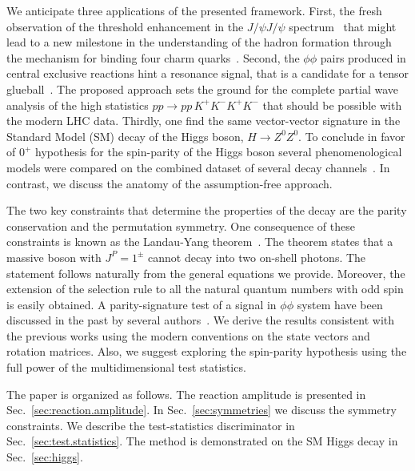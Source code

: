\documentclass[prd,preprintnumbers,floatfix,
nofootinbib,superscriptaddress]{revtex4}
\begin{document}
We anticipate three applications of the presented framework.
First, the fresh observation of the threshold enhancement in the $J/\psi J/\psi$ spectrum~\cite{Aaij:2020xyz}
that might lead to a new milestone in the understanding of the hadron formation through the mechanism for binding four charm quarks~\cite{Liu:2019zoy}.
Second, the $\phi\phi$ pairs produced in central exclusive reactions hint a resonance signal, that is a candidate for a tensor glueball~\cite{Lebiedowicz:2019jru}.
The proposed approach sets the ground for the complete partial wave analysis of the high statistics $pp\to pp\,K^+K^-K^+K^-$ that
should be possible with the modern LHC data.
Thirdly, one find the same vector-vector signature in the Standard Model (SM) decay of the Higgs boson, $H\to Z^0Z^0$.
To conclude in favor of $0^+$ hypothesis for the spin-parity of the Higgs boson
several phenomenological models were compared on the combined dataset of several decay channels~\cite{Aad:2013xqa,CMS:2018mmw}.
In contrast, we discuss the anatomy of the assumption-free approach.

The two key constraints that determine the properties of the decay are the parity conservation and the permutation symmetry.
One consequence of these constraints is known as the Landau-Yang theorem~\cite{Yang:1950rg,Landau:1948kw}.
The theorem states that a massive boson with $J^P = 1^\pm$ cannot decay into two on-shell photons.
The statement follows naturally from the general equations we provide. Moreover, the extension of the selection rule to all the natural quantum numbers with odd spin is easily obtained.
A parity-signature test of a signal in $\phi\phi$ system have been discussed in the past by several authors~\cite{Trueman:1978kh,Chang:1978jb,Collins:1977iv,Trueman:1978kh,Trueman:1978kh}.
We derive the results consistent with the previous works using the modern conventions on the state vectors and rotation matrices.
Also, we suggest exploring the spin-parity hypothesis using the full power of the multidimensional test statistics.

The paper is organized as follows. The reaction amplitude is presented in Sec.~\ref{sec:reaction.amplitude}.
In Sec.~\ref{sec:symmetries} we discuss the symmetry constraints.
We describe the test-statistics discriminator in Sec.~\ref{sec:test.statistics}.
The method is demonstrated on the SM Higgs decay in Sec.~\ref{sec:higgs}.

\end{document}
